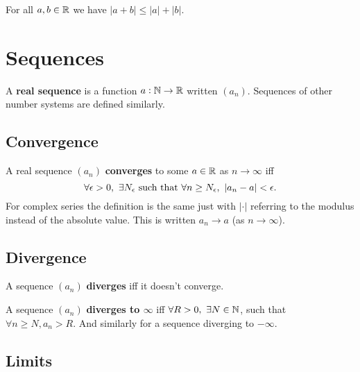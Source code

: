 \documentclass[../Year1/Year1.tex]{subfiles}
\begin{document}
\begin{theorem}
    For all $a,b\in\mathbb{R}$ we have $|a+b|\leq |a|+|b|$.
\end{theorem}

\section{Sequences}

\begin{definition}
    A \textbf{real sequence} is a function $a:\mathbb{N}\rightarrow\mathbb{R}$ written $(a_n)$. Sequences of other number systems are defined similarly.
\end{definition}

\subsection{Convergence}

\begin{definition}
    A real sequence $(a_n)$ \textbf{converges} to some $a\in\mathbb{R}$  as $n\rightarrow\infty$ iff \[
    \forall \epsilon>0, \  \exists N_\epsilon \ \text{\textcolor{black}{such that }} \forall n\geq N_\epsilon, \ |a_n-a|<\epsilon
    \textcolor{black}{.}
    \] For complex series the definition is the same just with $|\cdot|$ referring to the modulus instead of the absolute value. This is written $a_n\rightarrow a$ (as $n\rightarrow\infty$).
\end{definition}

\subsection{Divergence}

\begin{definition}[Divergence]
    A sequence $(a_n)$ \textbf{diverges} iff it doesn't converge.
\end{definition}

\begin{definition}
    A sequence $(a_n)$ \textbf{diverges to $\infty$} iff $\forall R>0, \ \exists N\in\mathbb{N}$, such that $\forall n\geq N, a_n>R$. And similarly for a sequence diverging to $-\infty$.
\end{definition}

\subsection{Limits}
\end{document}
